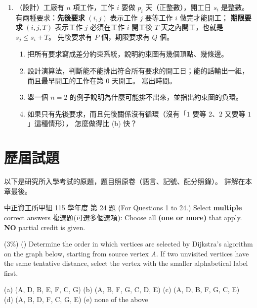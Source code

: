 \begin{enumerate}
\item \label{spt-q-sched}（設計）工廠有 $n$ 項工作，工作 $i$ 要做 $p_i$ 天（正整數），開工日 $s_i$
是整數。 有兩種要求：\textbf{先後要求} $(i, j)$ 表示工作 $j$ 要等工作 $i$ 做完才能開工；
\textbf{期限要求} $(i, j, T)$ 表示工作 $j$ 必須在工作 $i$ 開工後 $T$ 天之內開工，也就是
$s_j \le s_i + T$。 先後要求有 $P$ 個，期限要求有 $Q$ 個。
\begin{enumerate}
\item 把所有要求寫成差分約束系統，說明約束圖有幾個頂點、幾條邊。
\item 設計演算法，判斷能不能排出符合所有要求的開工日；能的話輸出一組，而且最早開工的工作在第
$0$ 天開工。 寫出時間。
\item 舉一個 $n = 2$ 的例子說明為什麼可能排不出來，並指出約束圖的負環。
\item 如果只有先後要求，而且先後關係沒有循環（沒有「$1$ 要等 $2$、$2$ 又要等 $1$」這種情形），
怎麼做得比 (b) 快？
\end{enumerate}
\end{enumerate}

\section{歷屆試題}
\label{sec:spt-pastexam}

以下是研究所入學考試的原題，題目照原卷（語言、記號、配分照錄）。 詳解在本章最後。

\begin{pastexam}[label={px:spt-1}]{中正資工所甲組 115 學年度 第 24 題}
(For Questions 1 to 24.) Select \textbf{multiple} correct answers 複選題(可選多個選項): Choose all
\textbf{(one or more)} that apply. \textbf{NO} partial credit is given.

(3\%) (\qquad) Determine the order in which vertices are selected by Dijkstra's algorithm on the
graph below, starting from source vertex \textit{A}. If two unvisited vertices have the same
tentative distance, select the vertex with the smaller alphabetical label first.
\begin{center}
\end{center}
(a) (A, D, B, E, F, C, G) \quad (b) (A, B, F, G, C, D, E) \quad (c) (A, D, B, F, G, C, E)\\
(d) (A, B, D, F, C, G, E) \quad (e) none of the above
\end{pastexam}

